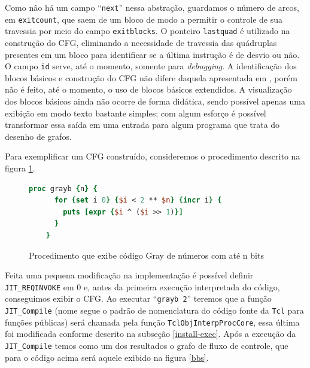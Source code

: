 Como não há um campo ``\verb!next!'' nessa abstração, guardamos o
número de arcos, em \verb!exitcount!, que saem de um bloco de modo a
permitir o controle de sua travessia por meio do campo
\verb!exitblocks!. O ponteiro \verb!lastquad! é
utilizado na construção do CFG, eliminando a necessidade de travessia das
quádruplas presentes em um bloco para identificar se a última
instrução é de desvio ou não. O campo \verb!id! serve, até o momento,
somente para \textit{debugging}. A identificação dos blocos básicos e
construção do CFG não difere daquela apresentada em
, porém não é feito, até o momento, o
uso de blocos básicos extendidos. A visualização dos blocos básicos
ainda não ocorre de forma didática, sendo possível apenas uma exibição
em modo texto bastante simples; com algum esforço é possível
transformar essa saída em uma entrada para algum programa que trata do
desenho de grafos.

Para exemplificar um CFG construído, consideremos o procedimento
descrito na figura \ref{fig:gray}.
\begin{figure}[h]
  \centering
  \begin{lstlisting}[language=Tcl]
    proc grayb {n} {
      for {set i 0} {$i < 2 ** $n} {incr i} {
        puts [expr {$i ^ ($i >> 1)}]
      }
    }
  \end{lstlisting}
  \caption{Procedimento que exibe código Gray de números com até n
    bits \label{fig:gray}}
\end{figure}
Feita uma pequena modificação na implementação é possível definir
\verb!JIT_REQINVOKE! em 0 e, antes da primeira execução interpretada do
código, conseguimos exibir o CFG. Ao executar ``\verb!grayb 2!''
teremos que a função \verb!JIT_Compile! (nome segue o padrão de
nomenclatura do código fonte da \texttt{Tcl} para funções públicas)
será chamada pela função
\verb!TclObjInterpProcCore!, essa última foi modificada conforme
descrito na subseção \ref{install-exec}. Após a execução da
\verb!JIT_Compile! temos como um dos resultados o grafo de fluxo de
controle, que para o código acima será aquele exibido na figura \ref{bbs}.

